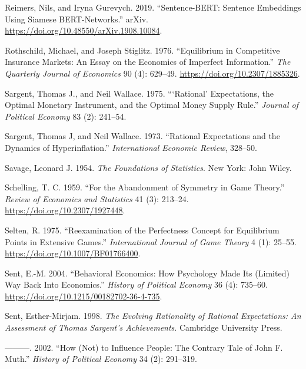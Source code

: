 \documentclass[
]{interact}
\newlength{\cslhangindent}
\newenvironment{CSLReferences}[2] %
 {\begin{list}{}{%
  \setlength{\itemindent}{0pt}
  \setlength{\leftmargin}{0pt}
  \setlength{\parsep}{0pt}
  \ifodd #1
   \setlength{\leftmargin}{\cslhangindent}
   \setlength{\itemindent}{-1\cslhangindent}
  \fi
  \setlength{\itemsep}{#2\baselineskip}}}
 {\end{list}}
\begin{document}
\begin{CSLReferences}{1}{0}
Reimers, Nils, and Iryna Gurevych. 2019. {``Sentence-{BERT}: {Sentence
Embeddings} Using {Siamese BERT-Networks}.''} arXiv.
\url{https://doi.org/10.48550/arXiv.1908.10084}.

Rothschild, Michael, and Joseph Stiglitz. 1976. {``Equilibrium in
{Competitive Insurance Markets}: {An Essay} on the {Economics} of
{Imperfect Information}.''} \emph{The Quarterly Journal of Economics} 90
(4): 629--49. \url{https://doi.org/10.2307/1885326}.

Sargent, Thomas J., and Neil Wallace. 1975. {``{`{Rational}'}
{Expectations}, the {Optimal Monetary Instrument}, and the {Optimal
Money Supply Rule}.''} \emph{Journal of Political Economy} 83 (2):
241--54.

Sargent, Thomas J, and Neil Wallace. 1973. {``Rational Expectations and
the Dynamics of Hyperinflation.''} \emph{International Economic Review},
328--50.

Savage, Leonard J. 1954. \emph{The {Foundations} of {Statistics}}. New
York: John Wiley.

Schelling, T. C. 1959. {``For the {Abandonment} of {Symmetry} in {Game
Theory}.''} \emph{Review of Economics and Statistics} 41 (3): 213--24.
\url{https://doi.org/10.2307/1927448}.

Selten, R. 1975. {``Reexamination of the Perfectness Concept for
Equilibrium Points in Extensive Games.''} \emph{International Journal of
Game Theory} 4 (1): 25--55. \url{https://doi.org/10.1007/BF01766400}.

Sent, E.-M. 2004. {``Behavioral {Economics}: {How Psychology Made Its}
({Limited}) {Way Back Into Economics}.''} \emph{History of Political
Economy} 36 (4): 735--60.
\url{https://doi.org/10.1215/00182702-36-4-735}.

Sent, Esther-Mirjam. 1998. \emph{The {Evolving Rationality} of {Rational
Expectations}: {An Assessment} of {Thomas Sargent}'s {Achievements}}.
Cambridge University Press.

---------. 2002. {``How ({Not}) to {Influence People}: {The Contrary
Tale} of {John F}. {Muth}.''} \emph{History of Political Economy} 34
(2): 291--319.


\end{CSLReferences}
\end{document}
